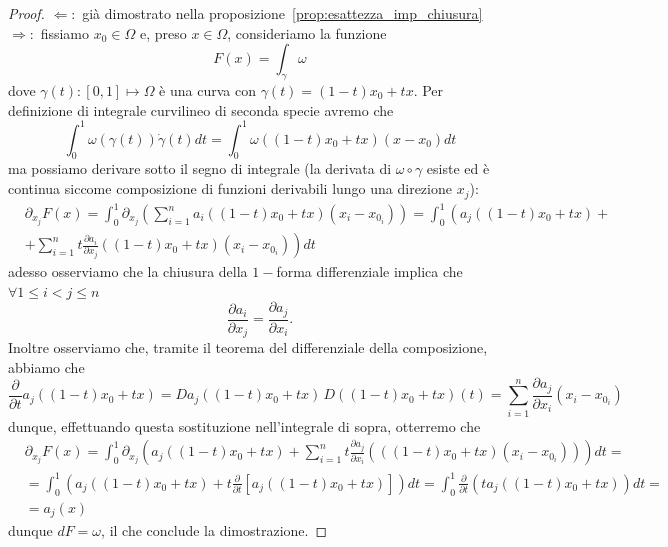 \begin{proof} 
	$\boxed{\Leftarrow}:$ già dimostrato nella proposizione~\ref{prop:esattezza_imp_chiusura} \\
	$\boxed{\Rightarrow}:$ %
	fissiamo $x_0 \in \Omega$ e, preso $x \in \Omega$, consideriamo la funzione
	$$
		F(x) = \int_\gamma \omega
	$$
	dove $\gamma(t) : [0, 1] \mapsto \Omega$ è una curva con $\gamma(t)=(1-t) x_0 + tx$. Per definizione di integrale curvilineo di seconda specie avremo che
	$$
		\int_0^1 \omega(\gamma(t)) \dot{\gamma}(t) dt = \int_0^1 \omega((1-t)x_0 + tx)(x-x_0)dt
	$$
	ma possiamo derivare sotto il segno di integrale (la derivata di $\omega \circ \gamma$ esiste ed è continua siccome composizione di funzioni derivabili lungo una direzione $x_j$):
	\begin{align*}
	&\partial_{x_j} F(x) = \int_0^1 \partial_{x_j} \left(\sum_{i=1}^n a_i((1-t)x_0 + tx)(x_i-x_{0_i}) \right) = \int_0^1 \left(a_j((1-t)x_0 + tx) + \right. \\
	&+ \left. \sum_{i=1}^n t\frac{\partial a_i}{\partial x_j}((1-t)x_0 + tx)(x_i - x_{0_i}) \right) dt
	\end{align*}
	adesso osserviamo che la chiusura della $1-$forma differenziale implica che $\forall 1 \leq i < j \leq n$
	$$
	\frac{\partial a_i}{\partial x_j} = \frac{\partial a_j}{\partial x_i}.
	$$
	Inoltre osserviamo che, tramite il teorema del differenziale della composizione, abbiamo che 
	$$
		\frac{\partial}{\partial t} a_j((1-t)x_0 + tx) = Da_j((1-t)x_0 + tx) \, D((1-t)x_0 + tx)(t) = \sum_{i=1}^n \frac{\partial a_j}{\partial x_i}(x_i - x_{0_i})
	$$
	dunque, effettuando questa sostituzione nell'integrale di sopra, otterremo che
	\begin{align*}
	&\partial_{x_j} F(x) = \int_0^1 \partial_{x_j} \left(a_j((1-t)x_0 + tx) + \sum_{i=1}^n t\frac{\partial a_j}{\partial x_i} \left( ((1-t)x_0 + tx) (x_i - x_{0_i}) \right) \right) dt = \\
	&=\int_0^1 \left( a_j((1-t)x_0 + tx) + t\frac{\partial}{\partial t} \left[ a_j((1-t)x_0 + tx) \right] \right)dt = \int_0^1 \frac{\partial}{\partial t} \left( ta_j((1-t)x_0 + tx) \right)dt = \\
	&=a_j(x) 
	\end{align*}
	dunque $dF=\omega$, il che conclude la dimostrazione.
\end{proof}
